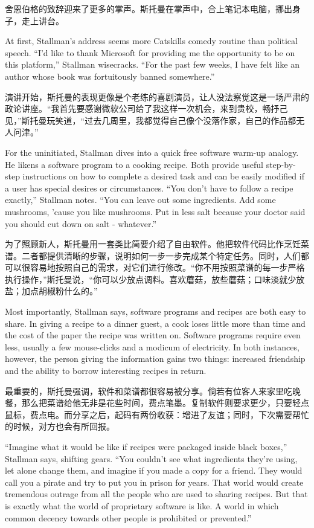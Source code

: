 \ifdefined\chs
舍恩伯格的致辞迎来了更多的掌声。斯托曼在掌声中，合上笔记本电脑，挪出身子，走上讲台。
\fi

\ifdefined\eng
At first, Stallman's address seems more Catskills comedy routine than political speech. ``I'd like to thank Microsoft for providing me the opportunity to be on this platform,'' Stallman wisecracks. ``For the past few weeks, I have felt like an author whose book was fortuitously banned somewhere.''
\fi

\ifdefined\chs
演讲开始，斯托曼的表现更像是个老练的喜剧演员，让人没法察觉这是一场严肃的政论讲座。``我首先要感谢微软公司给了我这样一次机会，来到贵校，畅抒己见，”斯托曼玩笑道，“过去几周里，我都觉得自己像个没落作家，自己的作品都无人问津。''
\fi

\ifdefined\eng
For the uninitiated, Stallman dives into a quick free software warm-up analogy. He likens a software program to a cooking recipe. Both provide useful step-by-step instructions on how to complete a desired task and can be easily modified if a user has special desires or circumstances. ``You don't have to follow a recipe exactly,'' Stallman notes. ``You can leave out some ingredients. Add some mushrooms, 'cause you like mushrooms. Put in less salt because your doctor said you should cut down on salt - whatever.''
\fi

\ifdefined\chs
为了照顾新人，斯托曼用一套类比简要介绍了自由软件。他把软件代码比作烹饪菜谱。二者都提供清晰的步骤，说明如何一步一步完成某个特定任务。同时，人们都可以很容易地按照自己的需求，对它们进行修改。``你不用按照菜谱的每一步严格执行操作，''斯托曼说，``你可以少放点调料。喜欢蘑菇，放些蘑菇；口味淡就少放盐；加点胡椒粉什么的。''
\fi

\ifdefined\eng
Most importantly, Stallman says, software programs and recipes are both easy to share. In giving a recipe to a dinner guest, a cook loses little more than time and the cost of the paper the recipe was written on. Software programs require even less, usually a few mouse-clicks and a modicum of electricity. In both instances, however, the person giving the information gains two things: increased friendship and the ability to borrow interesting recipes in return.
\fi

\ifdefined\chs
最重要的，斯托曼强调，软件和菜谱都很容易被分享。倘若有位客人来家里吃晚餐，那么把菜谱给他无非是花些时间，费点笔墨。复制软件则要求更少，只要轻点鼠标，费点电。而分享之后，起码有两份收获：增进了友谊；同时，下次需要帮忙的时候，对方也会有所回报。
\fi

\ifdefined\eng
``Imagine what it would be like if recipes were packaged inside black boxes,'' Stallman says, shifting gears. ``You couldn't see what ingredients they're using, let alone change them, and imagine if you made a copy for a friend. They would call you a pirate and try to put you in prison for years. That world would create tremendous outrage from all the people who are used to sharing recipes. But that is exactly what the world of proprietary software is like. A world in which common decency towards other people is prohibited or prevented.''
\fi

